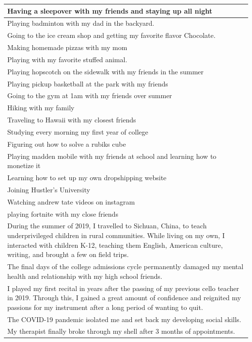 \documentclass[
  .7em,
  letterpaper,
  DIV=11,
  numbers=noendperiod]{scrartcl}
\begin{document}
\begin{table}
\begin{tabular}{l}
\hline
Having a sleepover with my friends and staying up all night\\
\hline
Playing badminton with my dad in the backyard.\\
\hline
Going to the ice cream shop and getting my favorite flavor Chocolate.\\
\hline
Making homemade pizzas with my mom\\
\hline
Playing with my favorite stuffed animal.\\
\hline
Playing hopscotch on the sidewalk with my friends in the summer\\
\hline
Playing pickup basketball at the park with my friends\\
\hline
Going to the gym at 1am with my friends over summer\\
\hline
Hiking with my family\\
\hline
Traveling to Hawaii with my closest friends\\
\hline
Studying every morning my first year of college\\
\hline
Figuring out how to solve a rubiks cube\\
\hline
Playing madden mobile with my friends at school and learning how to monetize it\\
\hline
Learning how to set up my own dropshipping website\\
\hline
Joining Hustler's University\\
\hline
Watching andrew tate videos on instagram\\
\hline
playing fortnite with my close friends\\
\hline
During the summer of 2019, I travelled to Sichuan, China, to teach underprivileged children in rural communities. While living on my own, I interacted with children K-12, teaching them English, American culture, writing, and brought a few on field trips.\\
\hline
The final days of the college admissions cycle permanently damaged my mental health and relationship with my high school friends.\\
\hline
I played my first recital in years after the passing of my previous cello teacher in 2019. Through this, I gained a great amount of confidence and reignited my passions for my instrument after a long period of wanting to quit.\\
\hline
The COVID-19 pandemic isolated me and set back my developing social skills.\\
\hline
My therapist finally broke through my shell after 3 months of appointments.\\

\end{tabular}
\end{table}
\end{document}
